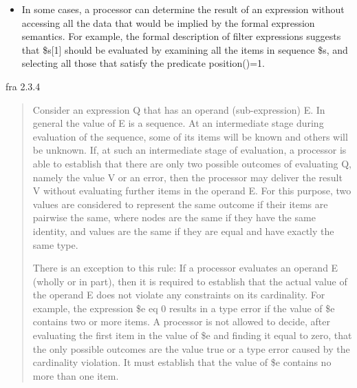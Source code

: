 \begin{itemize} 
   \item In some cases, a processor can determine the result of an expression without accessing all the data that
   would be implied by the formal expression semantics. For example, the formal description of filter expressions
   suggests that \$s[1] should be evaluated by examining all the items in sequence \$s, and selecting all those
   that satisfy the predicate position()=1.
\end{itemize}

fra 2.3.4 \cite{w3c00}
\begin{quote}
Consider an expression Q that has an operand (sub-expression) E. In general the value of E is a sequence. At an
intermediate stage during evaluation of the sequence, some of its items will be known and others will be unknown.
If, at such an intermediate stage of evaluation, a processor is able to establish that there are only two possible
outcomes of evaluating Q, namely the value V or an error, then the processor may deliver the result V without
evaluating further items in the operand E. For this purpose, two values are considered to represent the same
outcome if their items are pairwise the same, where nodes are the same if they have the same identity, and values
are the same if they are equal and have exactly the same type.

There is an exception to this rule: If a processor evaluates an operand E (wholly or in part), then it is required
to establish that the actual value of the operand E does not violate any constraints on its cardinality. For
example, the expression \$e eq 0 results in a type error if the value of \$e contains two or more items. A processor
is not allowed to decide, after evaluating the first item in the value of \$e and finding it equal to zero, that the
only possible outcomes are the value true or a type error caused by the cardinality violation. It must establish
that the value of \$e contains no more than one item.
\end{quote}
